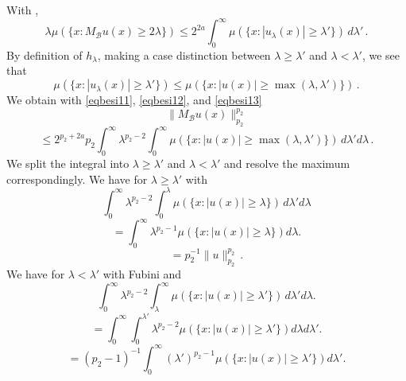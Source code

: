 With ,
\begin{equation}\label{eqbesi12}
    \lambda \mu(\{x: M_{\mathcal{B}}u(x)\ge 2\lambda\})\le
   2^{2a}
    \int_0^\infty \mu (\{x: |u_\lambda (x)|\ge \lambda'\})\, d\lambda'\, .
\end{equation}
By definition of $h_\lambda$, making a case distinction between $\lambda\ge \lambda'$ and $\lambda <\lambda'$, we see that
\begin{equation}\label{eqbesi13}
   \mu (\{x: |u_\lambda (x)|\ge \lambda'\})
   \le
   \mu (\{x: |u (x)|\ge \max(\lambda,\lambda')\})\, .
\end{equation}
We obtain with \eqref{eqbesi11},
\eqref{eqbesi12}, and \eqref{eqbesi13}
\begin{equation}
    \|M_{\mathcal{B}}u(x)\|_{p_2}^{p_2}
 \end{equation}
 \begin{equation}
   \le 2^{p_2+2a} p_2
   \int_0^\infty \lambda^{p_2-2}
   \int_0^\infty
   \mu (\{x: |u (x)|\ge \max(\lambda,\lambda')\})
   \, d\lambda'd\lambda\, .
\end{equation}
We split the integral into $\lambda\ge \lambda'$ and $\lambda<\lambda'$ and resolve the
maximum correspondingly.
We have for $\lambda\ge \lambda'$
with 
\begin{equation}
    \int_0^\infty \lambda^{p_2-2}
   \int_0^\lambda
   \mu (\{x: |u (x)|\ge \lambda\})
   \, d\lambda'd\lambda
\end{equation}
\begin{equation}
   =\int_0^\infty \lambda^{p_2-1}
     \mu (\{x: |u (x)|\ge \lambda\})
d\lambda.
\end{equation}
\begin{equation}\label{eqbesi14}
   =p_2^{-1} \|u\|_{p_2}^{p_2}\, .
\end{equation}
We have for $\lambda< \lambda'$
with Fubini and 
\begin{equation}
    \int_0^\infty \lambda^{p_2-2}
   \int_\lambda^\infty
   \mu (\{x: |u(x)|\ge \lambda'\})
   \, d\lambda'd\lambda.
\end{equation}
\begin{equation}
   =\int_0^\infty \int_0^{\lambda'}\lambda^{p_2-2}
     \mu (\{x: |u (x)|\ge \lambda'\})
d\lambda d\lambda'.
\end{equation}
\begin{equation}
   =(p_2-1)^{-1}\int_0^\infty (\lambda')^{p_2-1}
     \mu (\{x: |u(x)|\ge \lambda'\})
d\lambda'.
\end{equation}
